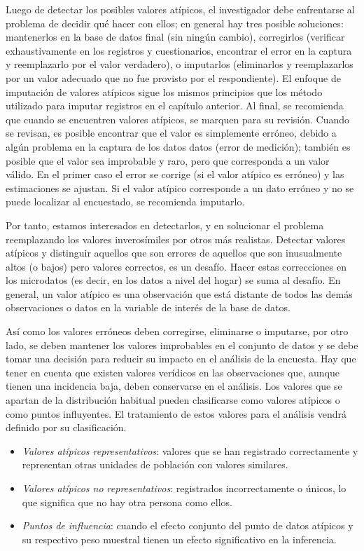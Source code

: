 \documentclass[
  12pt,
]{book}
\providecommand{\tightlist}{%
  \setlength{\itemsep}{0pt}\setlength{\parskip}{0pt}}
\begin{document}
Luego de detectar los posibles valores atípicos, el investigador debe enfrentarse al problema de decidir qué hacer con ellos; en general hay tres posible soluciones: mantenerlos en la base de datos final (sin ningún cambio), corregirlos (verificar exhaustivamente en los registros y cuestionarios, encontrar el error en la captura y reemplazarlo por el valor verdadero), o imputarlos (eliminarlos y reemplazarlos por un valor adecuado que no fue provisto por el respondiente). El enfoque de imputación de valores atípicos sigue los mismos principios que los método utilizado para imputar registros en el capítulo anterior. Al final, se recomienda que cuando se encuentren valores atípicos, se marquen para su revisión. Cuando se revisan, es posible encontrar que el valor es simplemente erróneo, debido a algún problema en la captura de los datos datos (error de medición); también es posible que el valor sea improbable y raro, pero que corresponda a un valor válido. En el primer caso el error se corrige (si el valor atípico es erróneo) y las estimaciones se ajustan. Si el valor atípico corresponde a un dato erróneo y no se puede localizar al encuestado, se recomienda imputarlo.

Por tanto, estamos interesados en detectarlos, y en solucionar el problema reemplazando los valores inverosímiles por otros más realistas. Detectar valores atípicos y distinguir aquellos que son errores de aquellos que son inusualmente altos (o bajos) pero valores correctos, es un desafío. Hacer estas
correcciones en los microdatos (es decir, en los datos a nivel del hogar) se suma al desafío. En general, un valor atípico es una observación que está distante de todos las demás observaciones o datos en la variable de interés de la base de datos.

Así como los valores erróneos deben corregirse, eliminarse o imputarse, por otro lado, se deben mantener los valores improbables en el conjunto de datos y se debe tomar una decisión para reducir su impacto en el análisis de la encuesta. Hay que tener en cuenta que existen valores verídicos en las observaciones que, aunque tienen una incidencia baja, deben conservarse en el análisis. Los valores que se apartan de la distribución habitual pueden clasificarse como valores atípicos o como puntos influyentes. El tratamiento de estos valores para el análisis vendrá definido por su clasificación.

\begin{itemize}
\tightlist
\item
  \emph{Valores atípicos representativos}: valores que se han registrado correctamente y representan otras unidades de población con valores similares.
\item
  \emph{Valores atípicos no representativos}: registrados incorrectamente o únicos, lo que significa que no hay otra persona como ellos.
\item
  \emph{Puntos de influencia}: cuando el efecto conjunto del punto de datos atípicos y su respectivo peso muestral tienen un efecto significativo en la inferencia.
\end{itemize}
\end{document}
